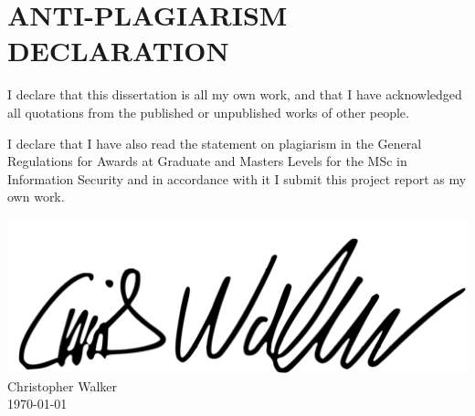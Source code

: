 

\newpage
\vspace*{\fill}
\section*{ANTI-PLAGIARISM DECLARATION}

I declare that this dissertation is all my own work, and that I have acknowledged all quotations from the published or unpublished works of other people.

I declare that I have also read the statement on plagiarism in the General Regulations for Awards at Graduate and Masters Levels for the MSc in Information Security and in accordance with it I submit this project report as my own work.

\includegraphics[scale=0.7]{lib/signature.png} \\

\noindent Christopher Walker \\ \today

\vspace*{\fill}